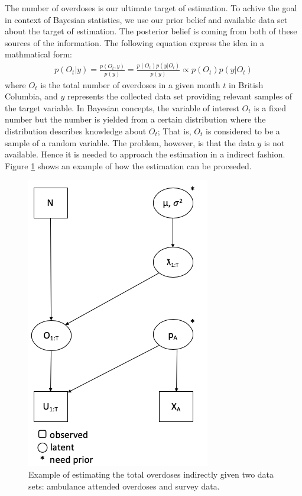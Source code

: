 \documentclass[]{article}
\begin{document}
The number of overdoses is our ultimate target of estimation. To achive the goal in context of Bayesian statistics, we use our prior belief and available data set about the target of estimation. The posterior belief is coming from both of these sources of the information. The following equation express the idea in a mathmatical form:
\begin{equation}
\label{bayes_thm}
\left.\begin{aligned}
p(O_t| y ) = \frac{ p(O_t, y)   }{ p(y)} = \frac{ p(O_t) p(y| O_t)}{ p(y)} \propto p(O_t) p(y| O_t) \end{aligned}\right.
\end{equation}
where $O_t$ is the total number of overdoses in a given month $t$ in British Columbia, and $y$ represents the collected data set providing relevant samples of the target variable. In Bayesian concepts, the variable of interest $O_t$ is a fixed number but the number is yielded from a certain distribution where the distribution describes knowledge about $O_t$; That is, $O_t$ is considered to be a sample of a random variable. The problem, however, is that the data $y$ is not available. Hence it is needed to approach the estimation in a indirect fashion. Figure \ref{simple_draw} shows an example of how the estimation can be proceeded. \\ 
\begin{figure}[htb]
	\centering
	\includegraphics[width=0.5\linewidth]{Figures/simple_drawing}
	\caption{Example of estimating the total overdoses indirectly given two data sets: ambulance attended overdoses and survey data.}
	\label{simple_draw}
\end{figure}
\end{document}
